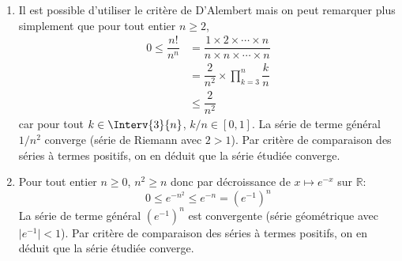 \documentclass[a4paper,10pt]{report}
\begin{document}
\begin{enumerate}
%
\item Il est possible d'utiliser le critère de D'Alembert mais on peut remarquer plus simplement que pour tout entier $n \geq 2$,
\begin{align*}
 0 \leq \dfrac{n!}{n^n} & = \dfrac{1 \times 2 \times \cdots \times n}{n \times n \times \cdots \times n} \\
 & = \dfrac{2}{n^2} \times \prod_{k=3}^n \dfrac{k}{n} \\
 & \leq \dfrac{2}{n^2}
 \end{align*}
car pour tout $k \in \Interv{3}{n}$, $k/n \in [0,1]$. La série de terme général $1/n^2$ converge (série de Riemann avec $2>1$). Par critère de comparaison des séries à termes positifs, on en déduit que la série étudiée converge.
\item Pour tout entier $n \geq 0$, $n^2 \geq n$ donc par décroissance de $x \mapsto e^{-x}$ sur $\mathbb{R}$:
$$ 0 \leq e^{-n^2} \leq e^{-n} = (e^{-1})^n$$
La série de terme général $(e^{-1})^n$ est convergente (série géométrique avec $\vert e^{-1}\vert <1$). Par critère de comparaison des séries à termes positifs, on en déduit que la série étudiée converge.

\medskip


\end{enumerate}
\end{document}
